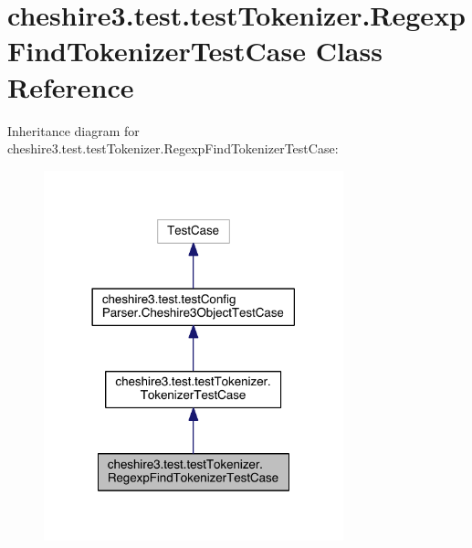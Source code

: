 \hypertarget{classcheshire3_1_1test_1_1test_tokenizer_1_1_regexp_find_tokenizer_test_case}{\section{cheshire3.\-test.\-test\-Tokenizer.\-Regexp\-Find\-Tokenizer\-Test\-Case Class Reference}
\label{classcheshire3_1_1test_1_1test_tokenizer_1_1_regexp_find_tokenizer_test_case}
}


Inheritance diagram for cheshire3.\-test.\-test\-Tokenizer.\-Regexp\-Find\-Tokenizer\-Test\-Case\-:
\nopagebreak
\begin{figure}[H]
\begin{center}
\leavevmode
\includegraphics[width=246pt]{classcheshire3_1_1test_1_1test_tokenizer_1_1_regexp_find_tokenizer_test_case__inherit__graph}
\end{center}
\end{figure}


